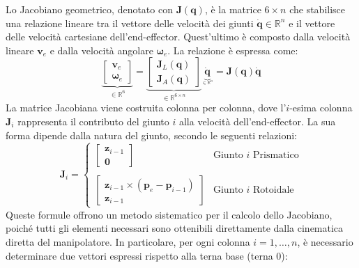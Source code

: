 ﻿\documentclass[11pt, a4paper]{article}
\begin{document}
Lo Jacobiano geometrico, denotato con \(\bm{J}(\bm{q})\), è la matrice \(6 \times n\) che stabilisce una relazione lineare tra il vettore delle velocità dei giunti \(\dot{\bm{q}} \in \mathbb{R}^n\) e il vettore delle velocità cartesiane dell'end-effector. Quest'ultimo è composto dalla velocità lineare \(\bm{v}_e\) e dalla velocità angolare \(\bm{\omega}_e\). La relazione è espressa come:
\[
    \underbrace{\begin{bmatrix}
        \bm{v}_e \\
        \bm{\omega}_e
    \end{bmatrix}}_{\in \mathbb{R}^{6}}
    =
    \underbrace{\begin{bmatrix}
        \bm{J}_{L}(\bm{q})\\
        \hline
        \bm{J}_{A}(\bm{q})
    \end{bmatrix}}_{\in \mathbb{R}^{6 \times n}}
    \underbrace{\dot{\bm{q}}}_{_{\in \mathbb{R}^{n}}}
    =
    \bm{J}(\bm{q})\dot{\bm{q}}
\]
La matrice Jacobiana viene costruita colonna per colonna, dove l'\(i\)-esima colonna \(\bm{J}_i\) rappresenta il contributo del giunto \(i\) alla velocità dell'end-effector. La sua forma dipende dalla natura del giunto, secondo le seguenti relazioni:
\begin{equation*}
    \bm{J}_i =
    \begin{cases}
        \begin{bmatrix} \bm{z}_{i-1} \\ \bm{0} \end{bmatrix} & \text{Giunto } i \text{ Prismatico} \\ \\
        \begin{bmatrix} \bm{z}_{i-1} \times (\bm{p}_e - \bm{p}_{i-1}) \\ \bm{z}_{i-1} \end{bmatrix} & \text{Giunto } i \text{ Rotoidale}
    \end{cases}
\end{equation*}
Queste formule offrono un metodo sistematico per il calcolo dello Jacobiano, poiché tutti gli elementi necessari sono ottenibili direttamente dalla cinematica diretta del manipolatore. In particolare, per ogni colonna \(i=1, \dots, n\), è necessario determinare due vettori espressi rispetto alla terna base (terna 0):
\end{document}
